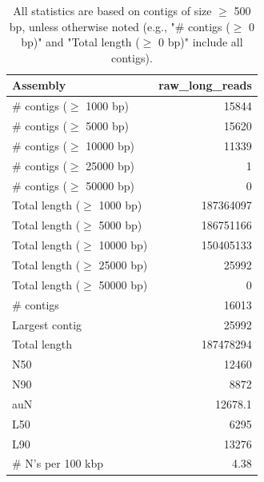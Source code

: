\documentclass[12pt,a4paper]{article}
\begin{document}
\begin{table}[ht]
\begin{center}
\caption{All statistics are based on contigs of size $\geq$ 500 bp, unless otherwise noted (e.g., "\# contigs ($\geq$ 0 bp)" and "Total length ($\geq$ 0 bp)" include all contigs).}
\begin{tabular}{|l*{1}{|r}|}
\hline
Assembly & raw\_long\_reads \\ \hline
\# contigs ($\geq$ 1000 bp) & 15844 \\ \hline
\# contigs ($\geq$ 5000 bp) & 15620 \\ \hline
\# contigs ($\geq$ 10000 bp) & 11339 \\ \hline
\# contigs ($\geq$ 25000 bp) & 1 \\ \hline
\# contigs ($\geq$ 50000 bp) & 0 \\ \hline
Total length ($\geq$ 1000 bp) & 187364097 \\ \hline
Total length ($\geq$ 5000 bp) & 186751166 \\ \hline
Total length ($\geq$ 10000 bp) & 150405133 \\ \hline
Total length ($\geq$ 25000 bp) & 25992 \\ \hline
Total length ($\geq$ 50000 bp) & 0 \\ \hline
\# contigs & 16013 \\ \hline
Largest contig & 25992 \\ \hline
Total length & 187478294 \\ \hline
N50 & 12460 \\ \hline
N90 & 8872 \\ \hline
auN & 12678.1 \\ \hline
L50 & 6295 \\ \hline
L90 & 13276 \\ \hline
\# N's per 100 kbp & 4.38 \\ \hline
\end{tabular}
\end{center}
\end{table}
\end{document}

